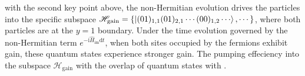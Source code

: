 \documentclass[longbibliography, aps, prx, amsmath, amssymb, amsfonts, twocolumn,superscriptaddress, footinbib]{revtex4-1}
\begin{document}
	{\color{blue}{Concerning}} with the second key point above,
	the non-Hermitian evolution drives the particles into the specific subspace
			$\mathscr{H}_{\text{gain}}=\left\{ \ket{(01)_{1,1}(01)_{2,1}\cdots(00)_{1,2}\cdots}, 
            \cdots \right\}$,
	where both particles are at the $y=1$ boundary.
	Under the time evolution governed by the non-Hermitian term $e^{-\mathrm{i}\hat{H}_{\text{im}} \mathrm{d}t}$, when both sites occupied by the fermions exhibit gain, these quantum states experience stronger gain. 
	The pumping effeciency into the subspace $\mathscr{H}_{\text{gain}}$ 
	{\color{blue}{scales}} with the overlap of quantum states with {}. 
\end{document}
